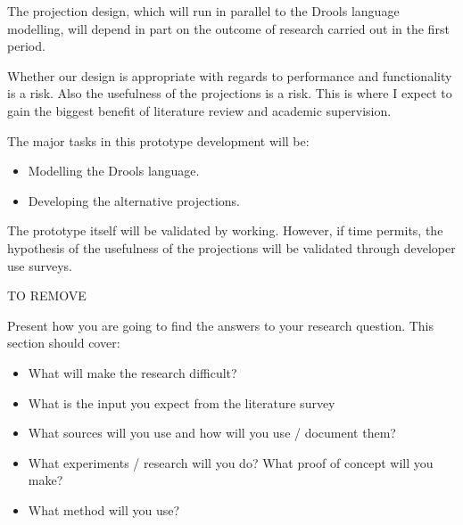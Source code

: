The projection design, which will run in parallel to the Drools language modelling, will depend in part on the outcome of research carried out in the first period.

Whether our design is appropriate with regards to performance and functionality is a risk. 
Also the usefulness of the projections is a risk.
This is where I expect to gain the biggest benefit of literature review and academic supervision. 

The major tasks in this prototype development will be: 
\begin{itemize}
    \item Modelling the Drools language.
    \item Developing the alternative projections.
\end{itemize}

The prototype itself will be validated by working.
However, if time permits, the hypothesis of the usefulness of the projections will be validated through developer use surveys.

{\LARGE TO REMOVE}

Present how you are going to find the answers to your research question. This section should cover:
\begin{itemize}
    \item What will make the research difficult?
    \item What is the input you expect from the literature survey
    \item What sources will you use and how will you use / document them?
    \item What experiments / research will you do? What proof of concept will you make?
	\item What method will you use?
\end{itemize}